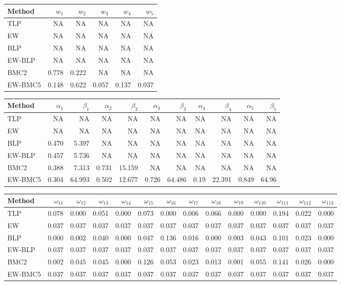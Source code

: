 \documentclass[
]{article}
\begin{document}
\begin{tabular}{lrrrrr}
\toprule
Method & $w_1$ & $w_2$ & $w_3$ & $w_4$ & $w_5$\\
\midrule
TLP & NA & NA & NA & NA & NA\\
EW & NA & NA & NA & NA & NA\\
BLP & NA & NA & NA & NA & NA\\
EW-BLP & NA & NA & NA & NA & NA\\
BMC2 & 0.778 & 0.222 & NA & NA & NA\\
EW-BMC5 & 0.148 & 0.622 & 0.057 & 0.137 & 0.037\\
\bottomrule
\end{tabular}

\begin{tabular}{lrrrrrrrrrr}
\toprule
Method & $\alpha_1$ & $\beta_1$ & $\alpha_2$ & $\beta_2$ & $\alpha_3$ & $\beta_3$ & $\alpha_4$ & $\beta_4$ & $\alpha_5$ & $\beta_5$\\
\midrule
TLP & NA & NA & NA & NA & NA & NA & NA & NA & NA & NA\\
EW & NA & NA & NA & NA & NA & NA & NA & NA & NA & NA\\
BLP & 0.470 & 5.397 & NA & NA & NA & NA & NA & NA & NA & NA\\
EW-BLP & 0.457 & 5.736 & NA & NA & NA & NA & NA & NA & NA & NA\\
BMC2 & 0.388 & 7.313 & 0.731 & 15.159 & NA & NA & NA & NA & NA & NA\\
EW-BMC5 & 0.304 & 64.993 & 0.502 & 12.677 & 0.726 & 64.486 & 0.19 & 22.391 & 0.849 & 64.96\\
\bottomrule
\end{tabular}

\begin{tabular}{lrrrrrrrrrrrrr}
\toprule
Method & $\omega_{11}$ & $\omega_{12}$ & $\omega_{13}$ & $\omega_{14}$ & $\omega_{15}$ & $\omega_{16}$ & $\omega_{17}$ & $\omega_{18}$ & $\omega_{19}$ & $\omega_{110}$ & $\omega_{111}$ & $\omega_{112}$ & $\omega_{113}$\\
\midrule
TLP & 0.078 & 0.000 & 0.051 & 0.000 & 0.073 & 0.000 & 0.006 & 0.066 & 0.000 & 0.000 & 0.194 & 0.022 & 0.000\\
EW & 0.037 & 0.037 & 0.037 & 0.037 & 0.037 & 0.037 & 0.037 & 0.037 & 0.037 & 0.037 & 0.037 & 0.037 & 0.037\\
BLP & 0.000 & 0.002 & 0.040 & 0.000 & 0.047 & 0.136 & 0.016 & 0.000 & 0.003 & 0.043 & 0.101 & 0.023 & 0.000\\
EW-BLP & 0.037 & 0.037 & 0.037 & 0.037 & 0.037 & 0.037 & 0.037 & 0.037 & 0.037 & 0.037 & 0.037 & 0.037 & 0.037\\
BMC2 & 0.002 & 0.045 & 0.045 & 0.000 & 0.126 & 0.053 & 0.023 & 0.013 & 0.001 & 0.055 & 0.141 & 0.026 & 0.000\\
EW-BMC5 & 0.037 & 0.037 & 0.037 & 0.037 & 0.037 & 0.037 & 0.037 & 0.037 & 0.037 & 0.037 & 0.037 & 0.037 & 0.037\\
\bottomrule
\end{tabular}
\end{document}
